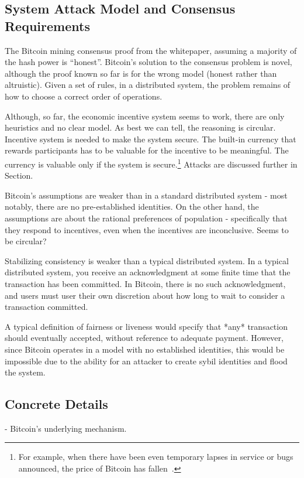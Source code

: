 \subsection{System Attack Model and Consensus Requirements}

The Bitcoin mining consensus proof from the whitepaper, assuming a majority of the hash power is ``honest''. Bitcoin's solution to the consensus problem is novel, although the proof known so far is for the wrong model (honest rather than altruistic). Given a set of rules, in a distributed system, the problem remains of how to choose a correct order of operations.

Although, so far, the economic incentive system seems to work, there are only heuristics and no clear model. As best we can tell, the reasoning is circular. Incentive system is needed to make the system secure. The built-in currency that rewards participants has to be valuable for the incentive to be meaningful. The currency is valuable only if the system is secure.\footnote{For example, when there have been even temporary lapses in service or bugs announced, the price of Bitcoin has fallen~\cite{bitcoin-fork-news}.} Attacks are discussed further in Section.

Bitcoin's assumptions are weaker than in a standard distributed system - most notably, there are no pre-established identities. On the other hand, the assumptions are about the rational preferences of population - specifically that they respond to incentives, even when the incentives are inconclusive. Seems to be circular?

Stabilizing consistency is weaker than a typical distributed system. In a typical distributed system, you receive an acknowledgment at some finite time that the transaction has been committed. In Bitcoin, there is no such acknowledgment, and users must user their own discretion about how long to wait to consider a transaction committed. 

A typical definition of fairness or liveness would specify that *any* transaction should eventually accepted, without reference to adequate payment. However, since Bitcoin operates in a model with no established identities, this would be impossible due to the ability for an attacker to create sybil identities and flood the system.

\subsection{Concrete Details}
- Bitcoin's underlying mechanism.


